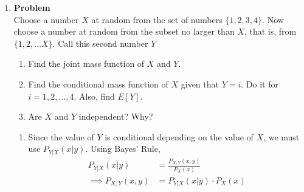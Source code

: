 \documentclass[12pt]{article}
\newenvironment{Ex}{\textbf{Problem}\vspace{.75em}\\}{}
\begin{document}
\begin{enumerate}
\begin{Ex}
\begin{solution}
\begin{enumerate}
\begin{equation}
          \label{eq:4b-sol}
          \begin{aligned}
            E[XY +XZ2 +YZ] &= E[XY]+E[XZ2]+E[YZ] \\
            &= \frac{4}{18} + \frac{3}{18} + \frac{6}{18} \\
            &= \frac{13}{18}
          \end{aligned}
        \end{equation}
      \item Yes. Knowing the value of $Z$ still does not provide
        information about the values of $X$ or $Y$.
        \begin{equation}
          \label{eq:4c-sol}
          \begin{aligned}
            E[XY|Z=1] &= \frac{4}{9} \\
          \end{aligned}
        \end{equation}
      \end{enumerate}
    \end{solution}
  \end{Ex}
\item
  \begin{Ex}
    Choose a number $X$ at random from the set of numbers $\{1, 2,
    3, 4\}$. Now choose a number at random from the subset no larger
    than $X$, that is, from $\{1,2,\ldots X\}$. Call this second
    number $Y$
    \begin{enumerate}
    \item Find the joint mass function of $X$ and $Y$.
    \item Find the conditional mass function of $X$ given that $Y =
      i$. Do it for $i = 1,2,\ldots ,4$. Also, find $E[Y]$.
    \item Are $X$ and $Y$ independent? Why?
    \end{enumerate}
    \begin{solution} \hfill
      \begin{enumerate}
      \item Since the value of $Y$ is conditional depending on the
        value of $X$, we must use $P_{Y|X}(x|y)$. Using Bayes' Rule,
        \begin{equation}
          \label{eq:5a-presol}
          \begin{aligned}
            P_{Y|X}(x|y) &= \frac{P_{X,Y}(x,y)}{P_X(x)} \\
            \implies P_{X,Y}(x,y) &= P_{Y|X}(x|y) \cdot P_X(x) \\
          \end{aligned}

\end{equation}
\end{enumerate}
\end{solution}
\end{Ex}
\end{enumerate}
\end{document}
